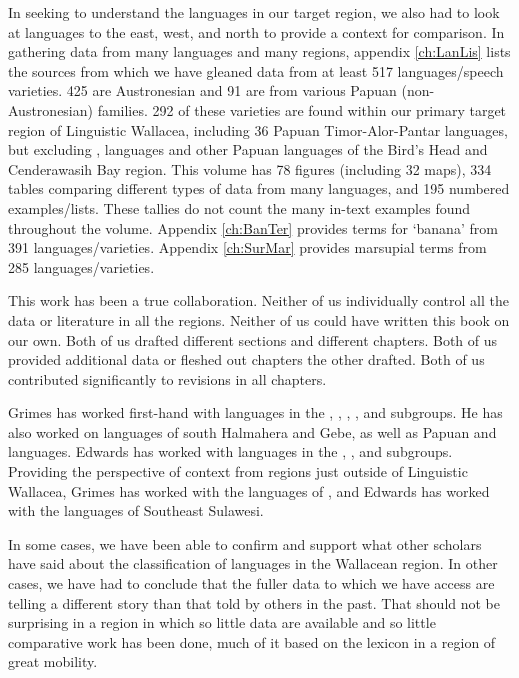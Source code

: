 In seeking to understand the languages in our target region,
we also had to look at languages to the east, west,
and north to provide a context for comparison.
In gathering data from many languages and many regions,
appendix \ref{ch:LanLis} lists the sources from which we have gleaned
data from at least 517 languages/speech varieties.
425 are Austronesian and 91 are from various Papuan (non-Austronesian) families.
292 of these varieties are found within our primary
target region of Linguistic Wallacea,
including 36 Papuan Timor-Alor-Pantar languages,
but excluding ,
 languages and other
Papuan languages of the Bird's Head and Cenderawasih Bay region.
This volume has 78 figures (including 32 maps),
334 tables comparing different types of data from many languages,
and 195 numbered examples/lists.
These tallies do not count the many in-text examples found throughout the volume.
Appendix \ref{ch:BanTer} provides terms for ‘banana’ from 391 languages/varieties.
Appendix \ref{ch:SurMar} provides marsupial terms from 285 languages/varieties.

This work has been a true collaboration.
Neither of us individually control all the data or literature in all the regions.
Neither of us could have written this book on our own.
Both of us drafted different sections and different chapters.
Both of us provided additional data or fleshed out chapters the other drafted.
Both of us contributed significantly to revisions in all chapters.

Grimes has worked first-hand with languages in the ,
, , , and  subgroups.
He has also worked on  languages of south Halmahera and Gebe,
as well as Papuan  and  languages.
Edwards has worked with languages in the ,
, and  subgroups.
Providing the perspective of context from regions just outside of Linguistic Wallacea,
Grimes has worked with the languages of ,
and Edwards has worked with the   languages of Southeast Sulawesi.

In some cases, we have been able to confirm and support what other scholars
have said about the classification of languages in the Wallacean region.
In other cases, we have had to conclude that the fuller data to which
we have access are telling a different story than that told by others in the past.
That should not be surprising in a region in which so
little data are available and so little comparative work has been done,
much of it based on the lexicon in a region of great mobility.

